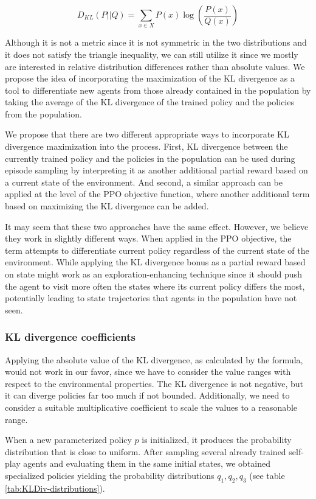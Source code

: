 \[
    D_{KL}(P||Q) = \sum_{x \in X}P(x)\log\left(\frac{P(x)}{Q(x)}\right)
\]

Although it is not a metric since it is not symmetric in the two distributions and it does not satisfy the triangle inequality, we can still utilize it since we mostly are interested in relative distribution differences rather than absolute values.
We propose the idea of incorporating the maximization of the KL divergence as a tool to differentiate new agents from those already contained in the population by taking the average of the KL divergence of the trained policy and the policies from the population.

We propose that there are two different appropriate ways to incorporate KL divergence maximization into the process.
First, KL divergence between the currently trained policy and the policies in the population can be used during episode sampling by interpreting it as another additional partial reward based on a current state of the environment.
And second, a similar approach can be applied at the level of the PPO objective function, where another additional term based on maximizing the KL divergence can be added.

It may seem that these two approaches have the same effect.
However, we believe they work in slightly different ways.
When applied in the PPO objective, the term attempts to differentiate current policy regardless of the current state of the environment.
While applying the KL divergence bonus as a partial reward based on state might work as an exploration-enhancing technique since it should push the agent to visit more often the states where its current policy differs the most, potentially leading to state trajectories that agents in the population have not seen.

\subsubsection{KL divergence coefficients}
Applying the absolute value of the KL divergence, as calculated by the formula, would not work in our favor, since we have to consider the value ranges with respect to the environmental properties.
The KL divergence is not negative, but it can diverge policies far too much if not bounded.
Additionally, we need to consider a suitable multiplicative coefficient to scale the values to a reasonable range.

When a new parameterized policy $p$ is initialized, it produces the probability distribution that is close to uniform.
After sampling several already trained self-play agents and evaluating them in the same initial states, we obtained specialized policies yielding the probability distributions $q_1, q_2, q_3$ (see table \ref{tab:KLDiv-distributions}).


